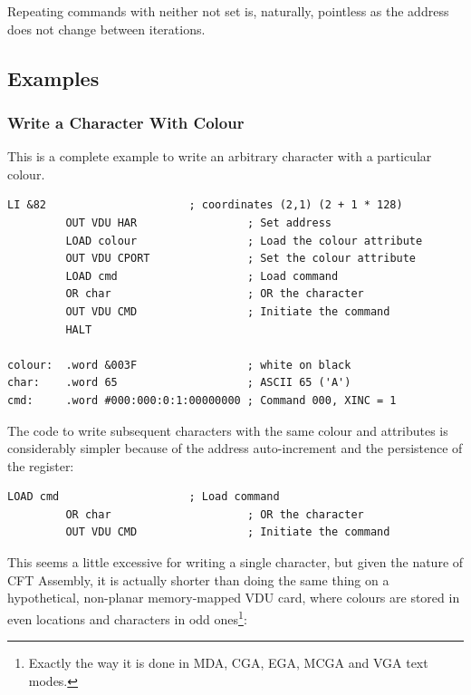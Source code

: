 Repeating commands with neither  not  set is,
naturally, pointless as the address does not change between iterations.


\subsection{Examples}

\subsubsection{Write a Character With Colour}

This is a complete example to write an arbitrary character with a particular
colour.

\begin{lstlisting}[language=cftasm]
         LI &82                      ; coordinates (2,1) (2 + 1 * 128)
         OUT VDU HAR                 ; Set address
         LOAD colour                 ; Load the colour attribute
         OUT VDU CPORT               ; Set the colour attribute
         LOAD cmd                    ; Load command
         OR char                     ; OR the character
         OUT VDU CMD                 ; Initiate the command
         HALT

colour:  .word &003F                 ; white on black
char:    .word 65                    ; ASCII 65 ('A')
cmd:     .word #000:000:0:1:00000000 ; Command 000, XINC = 1
\end{lstlisting}

\noindent The code to write subsequent characters with the same colour and attributes is
considerably simpler because of the address auto-increment and the persistence
of the  register:

\begin{lstlisting}[language=cftasm]
         LOAD cmd                    ; Load command
         OR char                     ; OR the character
         OUT VDU CMD                 ; Initiate the command
\end{lstlisting}

\noindent This seems a little excessive for writing a single character, but given the
nature of CFT Assembly, it is actually shorter than doing the same thing on a
hypothetical, non-planar memory-mapped VDU card, where colours are stored in
even locations and characters in odd ones\footnote{Exactly the way it is done
  in MDA, CGA, EGA, MCGA and VGA text modes.}:

